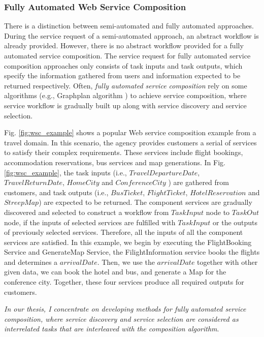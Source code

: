 \subsubsection{Fully Automated Web Service Composition}\label{fully}

There is a distinction between semi-automated and fully automated approaches. During the service request of a semi-automated approach, an abstract workflow is already provided. However, there is no abstract workflow provided for a fully automated service composition. The service request for fully automated service composition approaches only consists of task inputs and task outputs, which specify the information gathered from users and information expected to be returned respectively. Often, \emph{fully automated service composition} rely on some algorithms (e.g., Graphplan algorithm \cite{blum1997fast}) to achieve service composition, where service workflow is gradually built up along with service discovery and service selection. 

Fig. \ref{fig:wsc_example} shows a popular Web service composition example from a travel domain. In this scenario, the agency provides customers a serial of services to satisfy their complex requirements. These services include flight bookings, accommodation reservations, bus services and map generations. In Fig. \ref{fig:wsc_example}, the task inputs (i.e., $TravelDepartureDate$, $TravelReturnDate$, $HomeCity$ and $ConferenceCity$ ) are gathered from customers, and task outputs (i.e., $BusTicket$, $FlightTicket$, $HotelReservation$ and $StreepMap$) are expected to be returned. The component services are gradually discovered and selected to construct a workflow from $TaskInput$ node to $TaskOut$ node, if the inputs of selected services are fulfilled with $TaskInput$ or the outputs of previously selected services. Therefore, all the inputs of all the component services are satisfied. In this example, we begin by executing the FlightBooking Service and GenerateMap Service, the FilightInformation service books the flights and determines a $arrivalDate$. Then, we use the $arrivalDate$ together with other given data, we can book the hotel and bus, and generate a Map for the conference city. Together, these four services produce all required outputs for customers. 

\emph{In our thesis, I concentrate on developing methods for fully automated service composition, where service discovery and service selection are considered as interrelated tasks that are interleaved with the composition algorithm}. 

